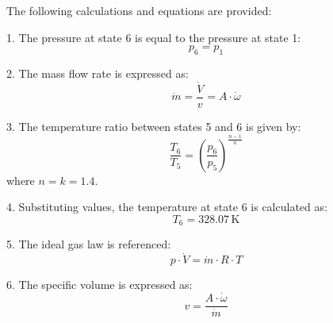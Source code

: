 The following calculations and equations are provided:  

1. The pressure at state 6 is equal to the pressure at state 1:  
\[
p_6 = p_1
\]

2. The mass flow rate is expressed as:  
\[
\dot{m} = \frac{\dot{V}}{v} = A \cdot \dot{\omega}
\]

3. The temperature ratio between states 5 and 6 is given by:  
\[
\frac{T_6}{T_5} = \left( \frac{p_6}{p_5} \right)^{\frac{n-1}{n}}
\]  
where \( n = k = 1.4 \).  

4. Substituting values, the temperature at state 6 is calculated as:  
\[
T_6 = 328.07 \, \text{K}
\]

5. The ideal gas law is referenced:  
\[
p \cdot \dot{V} = \dot{m} \cdot R \cdot T
\]

6. The specific volume is expressed as:  
\[
v = \frac{A \cdot \dot{\omega}}{\dot{m}}
\]